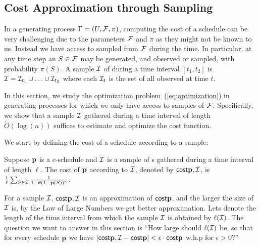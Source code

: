\subsection{Cost Approximation through Sampling}\label{sec:sampcomp}
	In a generating process $\Gamma = (U, \mathcal{F}, \pi)$, computing the cost of a schedule can be very challenging due to the parameters $\mathcal{F}$ and $\pi$ as they might not be known to us.
	Instead we have access to sampled {\ins} from $\mathcal{F}$ during the time. In particular, at any time step an {\ins} $S\in\mathcal{F}$ may be generated, and observed or sampled, with probability $\pi(S)$. A sample $\mathcal{I}$ of {\ins} during a time interval $[t_1, t_2]$ is $\mathcal{I}=\mathcal{I}_{t_1}\cup\ldots\cup\mathcal{I}_{t_2}$ where each $\mathcal{I}_t$ is the set of all observed {\ins} at time $t$.

	In this section, we study the optimization problem~(\ref{eq:optimization}) in generating processes for which we only have access to samples of $\mathcal{F}$. Specifically, we show that a sample $\mathcal{I}$ gathered during a time interval of length $\tilde O(\log(n))$ suffices to estimate and optimize the cost function.


	We start by defining the cost of a schedule according to a sample:
	\begin{definition}
	Suppose $\mathbf{p}$ is a $c$-schedule and $\mathcal{I}$ is a sample of {\ins}s gathered during a time interval of length $\ell$. The cost of $\mathbf{p}$ according to $\mathcal{I}$, denoted by $\mathsf{cost}{\mathbf{p},\mathcal{I}}$, is
	$\frac{1}{\ell}\sum_{S\in \mathcal{I}} \frac{1}{1-\theta(1-\mathbf{p}(S))^c}$.
	\end{definition}
	For a sample $\mathcal{I}$, $\mathsf{cost}{\mathbf{p},\mathcal{I}}$ is an approximation of $\mathsf{cost}{\mathbf{p}}$, and the larger the size of $\mathcal{I}$ is, by the Law of Large Numbers we get better approximation. Lets denote the length of the time interval from which the sample $\mathcal{I}$ is obtained by $\ell(\mathcal{I})$. The question we want to answer in this section is ``How large should $\ell(\mathcal{I})$ be, so that for every schedule $\mathbf{p}$ we have $|\mathsf{cost}{\mathbf{p},\mathcal{I}} - \mathsf{cost}{\mathbf{p}}| < \epsilon\cdot\mathsf{cost}{\mathbf{p}}$ w.h.p for $\epsilon > 0$?''

